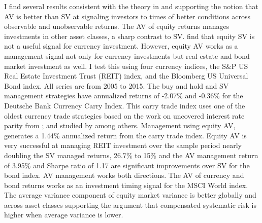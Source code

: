 I find several results consistent with the theory in \citet{pollet_average_2010} and supporting the notion that  AV is better than SV at signaling investors to times of better conditions across observable and unobservable returns. The AV of equity returns manages investments in other asset classes, a sharp contrast to SV.%
\citet{moreira_volatility-managed_2017} find that equity SV is not a useful signal for currency investment. However, equity AV works as a management signal not only for currency investments but real estate and bond market investment as well. %
I test this using four currency indices, the S\&P US Real Estate Investment Trust (REIT) index, and the Bloomberg US Universal Bond index. All series are from 2005 to 2015. The buy and hold and SV management strategies have annualized returns of -2.07\% and -0.36\% for the Deutsche Bank Currency Carry Index. This carry trade index uses one of the oldest currency trade strategies based on the work on uncovered interest rate parity from \citet{noauthor_speculative_nodate,fama_forward_1984}; and studied by \citet{lustig_cross_2007,brunnermeier_carry_nodate,burnside_carry_2011} among others. Management using equity AV, generates a 1.44\% annualized return from the carry trade index. %
Equity AV is very successful at managing REIT investment over the sample period nearly doubling the SV managed returns, 26.7\% to 15\% and the AV management return of 3.95\% and Sharpe ratio of 1.17 are significant improvements over SV for the bond index. AV management works both directions. The AV of currency and bond returns works as an investment timing signal for the MSCI World index. The average variance component of equity market variance is better globally and across asset classes supporting the argument that compensated systematic risk is higher when average variance is lower.

